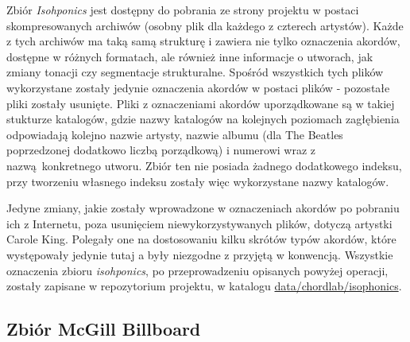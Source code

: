 Zbiór \emph{Isohponics} jest dostępny do pobrania ze strony projektu w postaci skompresowanych archiwów  (osobny plik dla każdego z czterech artystów). Każde z tych archiwów ma taką samą strukturę i zawiera nie tylko oznaczenia akordów, dostępne w różnych formatach, ale również inne informacje o utworach, jak zmiany tonacji czy segmentacje strukturalne. Spośród wszystkich tych plików wykorzystane zostały jedynie oznaczenia akordów w postaci plików  - pozostałe pliki zostały usunięte. Pliki z oznaczeniami akordów uporządkowane są w takiej stukturze katalogów, gdzie nazwy katalogów na kolejnych poziomach zagłębienia odpowiadają kolejno nazwie artysty, nazwie albumu (dla The Beatles poprzedzonej dodatkowo liczbą porządkową) i numerowi wraz z nazwą konkretnego utworu. Zbiór ten nie posiada żadnego dodatkowego indeksu, przy tworzeniu własnego indeksu zostały więc wykorzystane nazwy katalogów.

Jedyne zmiany, jakie zostały wprowadzone w oznaczeniach akordów po pobraniu ich z Internetu, poza usunięciem niewykorzystywanych plików, dotyczą artystki Carole King. Polegały one na dostosowaniu kilku skrótów typów akordów, które występowały jedynie tutaj a były niezgodne z przyjętą w \cite{harte_towards_nodate} konwencją. Wszystkie oznaczenia zbioru \emph{isohponics}, po przeprowadzeniu opisanych powyżej operacji, zostały zapisane w repozytorium projektu, w katalogu \url{data/chordlab/isophonics}.


\subsection{Zbiór McGill Billboard}

